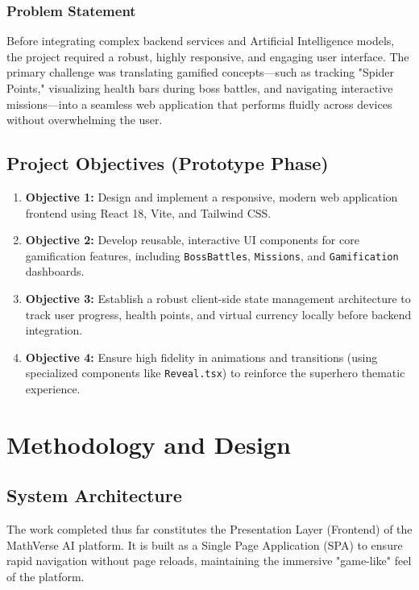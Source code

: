 \documentclass[12pt,a4paper]{report}
\begin{document}
\subsection{Problem Statement}
Before integrating complex backend services and Artificial Intelligence models, the project required a robust, highly responsive, and engaging user interface. The primary challenge was translating gamified concepts—such as tracking "Spider Points," visualizing health bars during boss battles, and navigating interactive missions—into a seamless web application that performs fluidly across devices without overwhelming the user.

\section{Project Objectives (Prototype Phase)}
\begin{enumerate}
    \item \textbf{Objective 1:} Design and implement a responsive, modern web application frontend using React 18, Vite, and Tailwind CSS.
    \item \textbf{Objective 2:} Develop reusable, interactive UI components for core gamification features, including \texttt{BossBattles}, \texttt{Missions}, and \texttt{Gamification} dashboards.
    \item \textbf{Objective 3:} Establish a robust client-side state management architecture to track user progress, health points, and virtual currency locally before backend integration.
    \item \textbf{Objective 4:} Ensure high fidelity in animations and transitions (using specialized components like \texttt{Reveal.tsx}) to reinforce the superhero thematic experience.
\end{enumerate}

\chapter{Methodology and Design}

\section{System Architecture}
The work completed thus far constitutes the Presentation Layer (Frontend) of the MathVerse AI platform. It is built as a Single Page Application (SPA) to ensure rapid navigation without page reloads, maintaining the immersive "game-like" feel of the platform.
\end{document}
